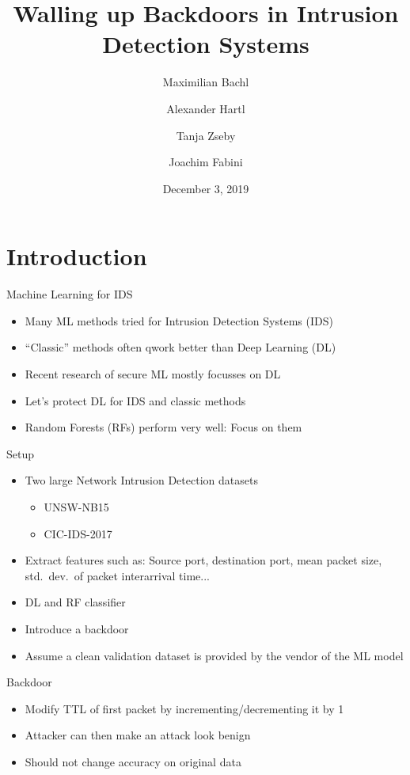 \documentclass[xcolor={dvipsnames}]{beamer}
\title{Walling up Backdoors in Intrusion Detection Systems}
\author[Maximilian Bachl]{%
	Maximilian Bachl\email{maximilian.bachl@tuwien.ac.at} \and Alexander Hartl\email{alexander.hartl@tuwien.ac.at} \and Tanja Zseby\email{tanja.zseby@tuwien.ac.at} \and Joachim Fabini\email{joachim.fabini@tuwien.ac.at}
}
\institute{%
	Technische Universität Wien, Vienna, Austria
}
\date[December 9, 2019]{December 3, 2019}
\begin{document}
\maketitle

\section{Introduction}

\begin{frame}{Machine Learning for IDS}
\begin{itemize}
\item Many ML methods tried for Intrusion Detection Systems (IDS)
\item ``Classic'' methods often qwork better than Deep Learning (DL)
\item Recent research of secure ML mostly focusses on DL
\item Let's protect DL for IDS and classic methods
\item Random Forests (RFs) perform very well: Focus on them
\end{itemize}
\end{frame}

\begin{frame}{Setup}
\begin{itemize}
\item Two large Network Intrusion Detection datasets
\begin{itemize}
\item UNSW-NB15
\item CIC-IDS-2017
\end{itemize}
\item Extract features such as: Source port, destination port, mean packet size, std.~dev.~of packet interarrival time...
\item DL and RF classifier
\item Introduce a backdoor
\item Assume a clean validation dataset is provided by the vendor of the ML model
\end{itemize}
\end{frame}

\begin{frame}{Backdoor}
\begin{itemize}
\item Modify TTL of first packet by incrementing/decrementing it by 1
\item Attacker can then make an attack look benign
\item Should not change accuracy on original data
\end{itemize}
\end{frame}
\end{document}
